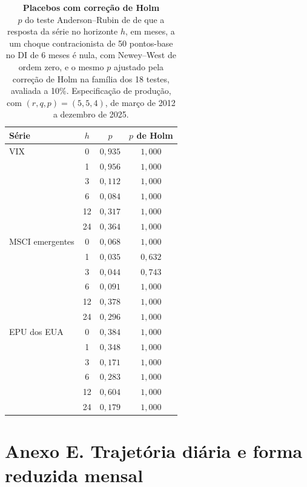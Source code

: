 \documentclass[preprint,authoryear,review,12pt]{elsarticle}
\begin{document}
\begin{table}[H]
\centering
\footnotesize
\begin{tabular}{@{}l c c c@{}}
\toprule
Série & $h$ & $p$ & $p$ de Holm \\
\midrule
VIX             & 0  & $0{,}935$ & $1{,}000$ \\
                & 1  & $0{,}956$ & $1{,}000$ \\
                & 3  & $0{,}112$ & $1{,}000$ \\
                & 6  & $0{,}084$ & $1{,}000$ \\
                & 12 & $0{,}317$ & $1{,}000$ \\
                & 24 & $0{,}364$ & $1{,}000$ \\
\addlinespace
MSCI emergentes & 0  & $0{,}068$ & $1{,}000$ \\
                & 1  & $0{,}035$ & $0{,}632$ \\
                & 3  & $0{,}044$ & $0{,}743$ \\
                & 6  & $0{,}091$ & $1{,}000$ \\
                & 12 & $0{,}378$ & $1{,}000$ \\
                & 24 & $0{,}296$ & $1{,}000$ \\
\addlinespace
EPU dos EUA     & 0  & $0{,}384$ & $1{,}000$ \\
                & 1  & $0{,}348$ & $1{,}000$ \\
                & 3  & $0{,}171$ & $1{,}000$ \\
                & 6  & $0{,}283$ & $1{,}000$ \\
                & 12 & $0{,}604$ & $1{,}000$ \\
                & 24 & $0{,}179$ & $1{,}000$ \\
\bottomrule
\end{tabular}
\caption{\textbf{Placebos com correção de Holm}\\{$p$ do teste Anderson--Rubin de \cite{montielolea} de que a resposta da série no horizonte $h$, em meses, a um choque contracionista de 50 pontos-base no DI de 6 meses é nula, com Newey--West de ordem zero, e o mesmo $p$ ajustado pela correção de Holm na família dos 18 testes, avaliada a 10\%. Especificação de produção, com $(r,q,p)=(5,5,4)$, de março de 2012 a dezembro de 2025.}}
\label{tab:placebos_holm}
\end{table}

\section*{Anexo E. Trajetória diária e forma reduzida mensal}\label{anexo-E}
\end{document}
